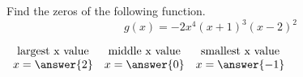 \documentclass{ximera}
\author{David Kish}
\begin{document}
\begin{exercise}
Find the zeros of the following function.
\[
g(x)=-2x^4(x+1)^3(x-2)^2
\]

\begin{center}
$
\begin{array}{ccc}
\text{largest x value} & \text{middle x value} & \text{smallest x value}\\
x = \answer{2} & x  = \answer{0} & x = \answer{-1}
\end{array}
$
\end{center}
\end{exercise}
\end{document}
